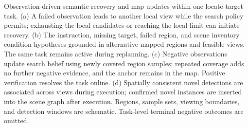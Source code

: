 \caption{Observation-driven semantic recovery and map updates within one locate-target task. (a) A failed observation leads to another local view while the search policy permits; exhausting the local candidates or reaching the local limit can initiate recovery. (b) The instruction, missing target, failed region, and scene inventory condition hypotheses grounded in alternative mapped regions and feasible views. The same task remains active during replanning. (c) Negative observations update search belief using newly covered region samples; repeated coverage adds no further negative evidence, and the anchor remains in the map. Positive verification resolves the task online. (d) Spatially consistent novel detections are associated across views during execution; confirmed novel instances are inserted into the scene graph after execution. Regions, sample sets, viewing boundaries, and detection windows are schematic. Task-level terminal negative outcomes are omitted.}
